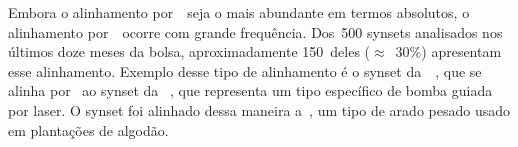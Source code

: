 Embora o alinhamento por~\eqsyn\ seja o mais abundante em termos absolutos, o
alinhamento por~\eqhypo\ ocorre com grande frequência. Dos~500 synsets
analisados nos últimos doze meses da bolsa, aproximadamente 150~deles
($\approx$~30\%) apresentam esse alinhamento. Exemplo desse tipo de alinhamento
é o synset da~\wnbr\ , que se
alinha por \eqhypo\ ao synset da \wnpr\ , que representa um tipo específico de bomba guiada por laser.
O synset  foi alinhado dessa maneira a~,
um tipo de arado pesado usado em plantações de algodão.
